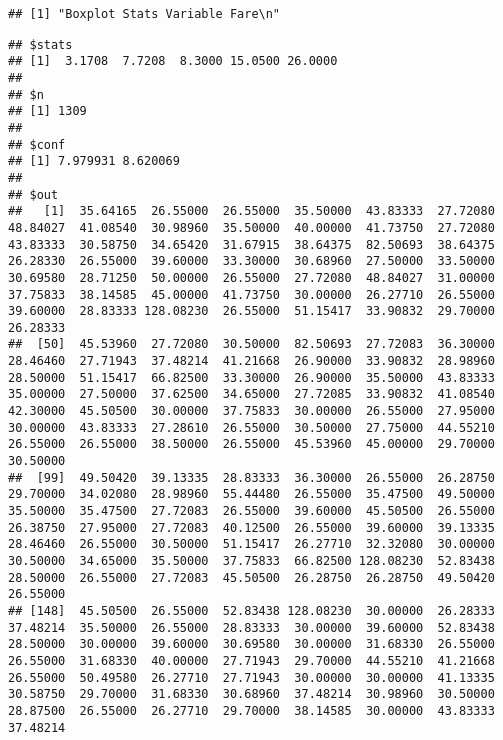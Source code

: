 \documentclass[
]{article}
\newenvironment{Shaded}{\begin{snugshade}}{\end{snugshade}}
\newcommand{\DataTypeTok}[1]{\textcolor[rgb]{0.87,0.87,0.75}{#1}}
\newcommand{\FloatTok}[1]{\textcolor[rgb]{0.75,0.75,0.82}{#1}}
\newcommand{\KeywordTok}[1]{\textcolor[rgb]{0.94,0.87,0.69}{#1}}
\newcommand{\NormalTok}[1]{\textcolor[rgb]{0.80,0.80,0.80}{#1}}
\newcommand{\OperatorTok}[1]{\textcolor[rgb]{0.94,0.94,0.82}{#1}}
\newcommand{\OtherTok}[1]{\textcolor[rgb]{0.94,0.94,0.56}{#1}}
\begin{document}
\begin{verbatim}
## [1] "Boxplot Stats Variable Fare\n"
\end{verbatim}

\begin{Shaded}
\end{Shaded}

\begin{verbatim}
## $stats
## [1]  3.1708  7.7208  8.3000 15.0500 26.0000
## 
## $n
## [1] 1309
## 
## $conf
## [1] 7.979931 8.620069
## 
## $out
##   [1]  35.64165  26.55000  26.55000  35.50000  43.83333  27.72080  48.84027  41.08540  30.98960  35.50000  40.00000  41.73750  27.72080  43.83333  30.58750  34.65420  31.67915  38.64375  82.50693  38.64375  26.28330  26.55000  39.60000  33.30000  30.68960  27.50000  33.50000  30.69580  28.71250  50.00000  26.55000  27.72080  48.84027  31.00000  37.75833  38.14585  45.00000  41.73750  30.00000  26.27710  26.55000  39.60000  28.83333 128.08230  26.55000  51.15417  33.90832  29.70000  26.28333
##  [50]  45.53960  27.72080  30.50000  82.50693  27.72083  36.30000  28.46460  27.71943  37.48214  41.21668  26.90000  33.90832  28.98960  28.50000  51.15417  66.82500  33.30000  26.90000  35.50000  43.83333  35.00000  27.50000  37.62500  34.65000  27.72085  33.90832  41.08540  42.30000  45.50500  30.00000  37.75833  30.00000  26.55000  27.95000  30.00000  43.83333  27.28610  26.55000  30.50000  27.75000  44.55210  26.55000  26.55000  38.50000  26.55000  45.53960  45.00000  29.70000  30.50000
##  [99]  49.50420  39.13335  28.83333  36.30000  26.55000  26.28750  29.70000  34.02080  28.98960  55.44480  26.55000  35.47500  49.50000  35.50000  35.47500  27.72083  26.55000  39.60000  45.50500  26.55000  26.38750  27.95000  27.72083  40.12500  26.55000  39.60000  39.13335  28.46460  26.55000  30.50000  51.15417  26.27710  32.32080  30.00000  30.50000  34.65000  35.50000  37.75833  66.82500 128.08230  52.83438  28.50000  26.55000  27.72083  45.50500  26.28750  26.28750  49.50420  26.55000
## [148]  45.50500  26.55000  52.83438 128.08230  30.00000  26.28333  37.48214  35.50000  26.55000  28.83333  30.00000  39.60000  52.83438  28.50000  30.00000  39.60000  30.69580  30.00000  31.68330  26.55000  26.55000  31.68330  40.00000  27.71943  29.70000  44.55210  41.21668  26.55000  50.49580  26.27710  27.71943  30.00000  30.00000  41.13335  30.58750  29.70000  31.68330  30.68960  37.48214  30.98960  30.50000  28.87500  26.55000  26.27710  29.70000  38.14585  30.00000  43.83333  37.48214

\end{verbatim}
\end{document}
